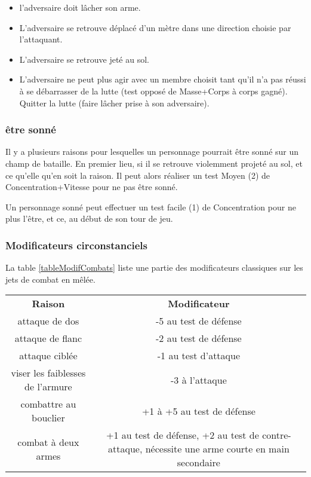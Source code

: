 \documentclass[10pt,a4paper,twocolumn]{book}
\begin{document}
\begin{itemize}
\item{}l’adversaire doit lâcher son arme.
\item{}L’adversaire se retrouve déplacé d’un mètre dans une direction choisie par l’attaquant.
\item{}L’adversaire se retrouve jeté au sol.
\item{}L’adversaire ne peut plus agir avec un membre choisit tant qu’il n’a pas réussi à se débarrasser de la lutte (test opposé de Masse+Corps à corps gagné).
Quitter la lutte (faire lâcher prise à son adversaire).
\end{itemize}

\subsubsection{être sonné}
Il y a plusieurs raisons pour lesquelles un personnage pourrait être sonné sur un champ de bataille.
    En premier lieu, si il se retrouve violemment projeté au sol, et ce qu’elle qu’en soit la raison. Il peut alors réaliser un test Moyen (2) de Concentration+Vitesse pour ne pas être sonné.

Un personnage sonné peut effectuer un test facile (1) de Concentration pour ne plus l’être, et ce, au début de son tour de jeu.
\subsubsection{Modificateurs circonstanciels}
La table \ref{tableModifCombats} liste une partie des modificateurs classiques sur les jets de combat en mêlée.
\begin{table*}
\caption{ Modificateurs courants en combat :}
\label{tableModifCombats}
\begin{center}
\begin{tabular}{cc}
\textbf{Raison} & \textbf{Modificateur} \\
   attaque de dos & -5 au test de défense  \\
   attaque de flanc & -2 au test de défense  \\
   attaque ciblée & -1 au test d'attaque\\
   viser les faiblesses de l'armure & -3 à l'attaque\\
   combattre au bouclier & +1 à +5 au test de défense \\
   combat à deux armes & +1 au test de défense, +2 au test de contre-attaque, nécessite une arme courte en main secondaire\\
\end{tabular}
\end{center}
\end{table*}
\end{document}

